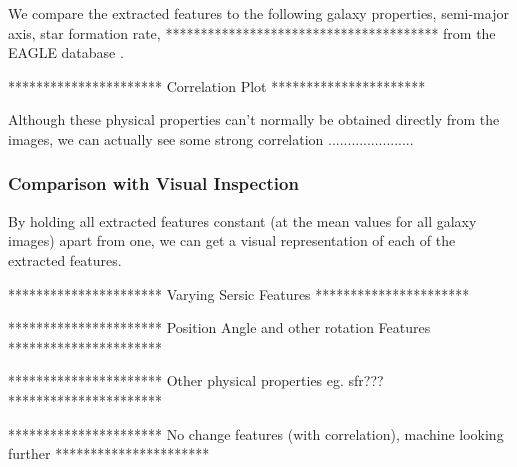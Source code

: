 \documentclass[12pt, onecolumn]{article}
\begin{document}
        We compare the extracted features to the following galaxy properties, semi-major axis, star formation rate, *************************************** from the EAGLE database \cite{eagle_catalogue_public_release}.

        \vspace{5mm}

        **********************
        Correlation Plot
        **********************

        \vspace{5mm}

        Although these physical properties can't normally be obtained directly from the images, we can actually see some strong correlation ......................

        



        \subsubsection{Comparison with Visual Inspection}
        \label{visual_inspection}

        By holding all extracted features constant (at the mean values for all galaxy images) apart from one, we can get a visual representation of each of the extracted features.

        \vspace{5mm}

        **********************
        Varying Sersic Features
        **********************

        \vspace{5mm}

        \vspace{5mm}

        **********************
        Position Angle and other rotation Features
        **********************

        \vspace{5mm}

        \vspace{5mm}

        **********************
        Other physical properties eg. sfr???
        **********************

        \vspace{5mm}

        \vspace{5mm}

        **********************
        No change features (with correlation), machine looking further
        **********************
\end{document}
